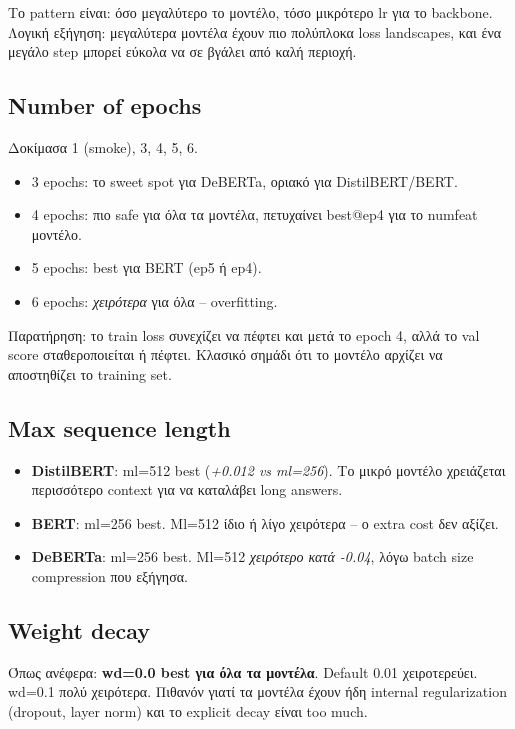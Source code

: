 \documentclass[12pt]{fphw}
\begin{document}
Το pattern είναι: όσο μεγαλύτερο το μοντέλο, τόσο μικρότερο lr για το backbone. Λογική εξήγηση: μεγαλύτερα μοντέλα έχουν πιο πολύπλοκα loss landscapes, και ένα μεγάλο step μπορεί εύκολα να σε βγάλει από καλή περιοχή.

\subsection{Number of epochs}

Δοκίμασα 1 (smoke), 3, 4, 5, 6.

\begin{itemize}
    \item 3 epochs: το sweet spot για DeBERTa, οριακό για DistilBERT/BERT.
    \item 4 epochs: πιο safe για όλα τα μοντέλα, πετυχαίνει best@ep4 για το numfeat μοντέλο.
    \item 5 epochs: best για BERT (ep5 ή ep4).
    \item 6 epochs: \emph{χειρότερα} για όλα -- overfitting.
\end{itemize}

Παρατήρηση: το train loss συνεχίζει να πέφτει και μετά το epoch 4, αλλά το val score σταθεροποιείται ή πέφτει. Κλασικό σημάδι ότι το μοντέλο αρχίζει να αποστηθίζει το training set.

\subsection{Max sequence length}

\begin{itemize}
    \item \textbf{DistilBERT}: ml=512 best (\emph{+0.012 vs ml=256}). Το μικρό μοντέλο χρειάζεται περισσότερο context για να καταλάβει long answers.
    \item \textbf{BERT}: ml=256 best. Ml=512 ίδιο ή λίγο χειρότερα -- ο extra cost δεν αξίζει.
    \item \textbf{DeBERTa}: ml=256 best. Ml=512 \emph{χειρότερο κατά -0.04}, λόγω batch size compression που εξήγησα.
\end{itemize}

\subsection{Weight decay}

Όπως ανέφερα: \textbf{wd=0.0 best για όλα τα μοντέλα}. Default 0.01 χειροτερεύει. wd=0.1 πολύ χειρότερα. Πιθανόν γιατί τα μοντέλα έχουν ήδη internal regularization (dropout, layer norm) και το explicit decay είναι too much.
\end{document}
